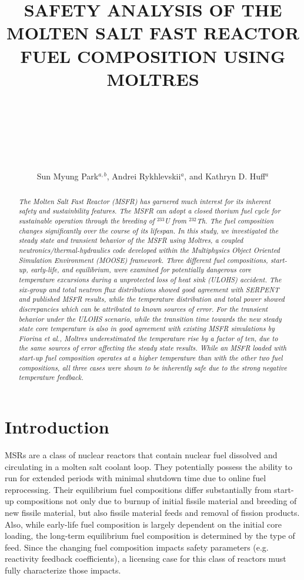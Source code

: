 \documentclass{anstrans}
\title{SAFETY ANALYSIS OF THE MOLTEN SALT FAST REACTOR FUEL COMPOSITION USING
MOLTRES \\~\\~\\~\\}
\author{Sun Myung Park$^{a,b}$, Andrei Rykhlevskii$^a$, and
Kathryn D. Huff$^a$}
\institute{$^a$Dept. of Nuclear, Plasma and Radiological Engineering,
University of Illinois at Urbana-Champaign}
\begin{document}
\begin{abstract}
%
\textit{
    The Molten
    Salt Fast Reactor (MSFR) has garnered much interest for its inherent
    safety and sustainbility features. The MSFR can adopt a closed thorium fuel
    cycle for
    sustainable operation through the breeding of $^{233}$U from $^{232}$Th.
    The fuel composition changes significantly over the course of its lifespan.
    In this study, we investigated the steady state and transient behavior of
    the MSFR using Moltres, a coupled neutronics/thermal-hydraulics code
    developed within the Multiphysics Object Oriented Simulation Environment
    (MOOSE) framework. Three different fuel compositions, start-up,
    early-life, and equilibrium, were examined for potentially
    dangerous
    core temperature excursions during a unprotected loss of heat sink (ULOHS)
    accident. The six-group and total neutron flux distributions 
    showed good agreement with SERPENT and
    published MSFR results, while the temperature distribution and total power
    showed discrepancies which can be attributed to known sources of error.
    For the transient behavior under the ULOHS
    scenario, while the transition time towards the new steady state core
    temperature is also in good agreement with existing MSFR simulations by
    Fiorina et al., Moltres underestimated the
    temperature rise by a factor of ten, due to the same sources of
    error affecting the steady state results. While an MSFR loaded with
    start-up fuel composition operates at a higher temperature than with the
    other two fuel compositions, all three cases were shown to be inherently
    safe due to the strong negative temperature feedback.
}
\end{abstract}

\section{Introduction}

	\glspl{MSR} are a class of nuclear reactors that
	contain nuclear fuel dissolved and circulating in a molten salt coolant
	loop.
	They potentially possess the ability to run for extended 
    periods with minimal shutdown time due to online fuel reprocessing.
    Their equilibrium fuel compositions differ substantially from
    start-up compositions not only due to burnup of initial fissile material
    and breeding of new fissile material, but also fissile material feeds and 
    removal of fission products. Also, while early-life fuel composition is
    largely dependent on the initial core loading, the long-term equilibrium
    fuel composition is determined by the type of feed.
    Since the changing fuel composition 
    impacts safety parameters (e.g. reactivity feedback coefficients), a 
    licensing case for this class of reactors  must fully characterize 
    those impacts.
\end{document}
